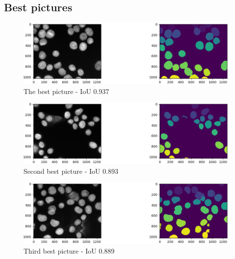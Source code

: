 \documentclass{article}
\begin{document}
\subsection{Best pictures}
\begin{figure}[H]
\centering
\includegraphics[width=\textwidth]{figures/1_best.png}
\caption{The best picture - IoU 0.937}
\end{figure}

\begin{figure}[H]
\centering
\includegraphics[width=\textwidth]{figures/2_best.png}
\caption{Second best picture - IoU 0.893}
\end{figure}


\begin{figure}[H]
\centering
\includegraphics[width=\textwidth]{figures/3_best.png}
\caption{Third best picture - IoU 0.889}
\end{figure}
\end{document}
